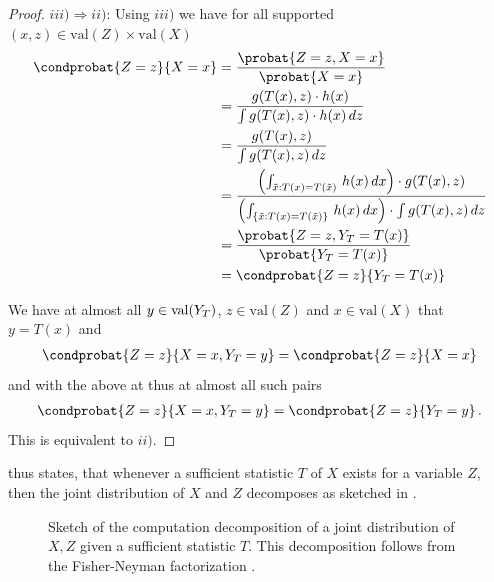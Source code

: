 \documentclass[aps,onecolumn,nofootinbib,pra]{article}
\begin{document}
\begin{proof}
        $iii) \Rightarrow ii)$:
        Using $iii)$ we have for all supported $(x,z)\in\mathrm{val}(Z)\times \mathrm{val}(X)$
        \begin{align*}
            \condprobat{Z=z}{X=x}
            &= \frac{\probat{Z=z,X=x}}{\probat{X=x}} \\
            &= \frac{g(T(x),z) \cdot h(x) }{\int g(T(x),z) \cdot h(x) \, dz} \\
            &= \frac{g(T(x),z)}{\int g(T(x),z)  \, dz} \\
            &= \frac{
                \left(\int_{\tilde{x}:T(x)=T(\tilde{x})} \, h(x) \, dx \right) \cdot g(T(x),z)
            }{
                \left(\int_{\{\tilde{x}:T(x)=T(\tilde{x})\}} \, h(x) \, dx \right) \cdot \int g(T(x),z)  \, dz
            } \\
            &= \frac{\probat{Z=z,\headvariableof{T}=T(x)}}{\probat{\headvariableof{T}=T(x)}} \\
            &= \condprobat{Z=z}{\headvariableof{T}=T(x)}
        \end{align*}

        We have at almost all $y\in\mathrm{val}(Y_{T})$, $z\in\mathrm{val}(Z)$ and $x\in\mathrm{val}(X)$ that $y=T(x)$ and
        \begin{align*}
            \condprobat{Z=z}{X=x,\headvariableof{T}=y}
            = \condprobat{Z=z}{X=x}
        \end{align*}
        and with the above at thus at almost all such pairs
        \begin{align*}
            \condprobat{Z=z}{X=x,\headvariableof{T}=y} = \condprobat{Z=z}{\headvariableof{T}=y} \, .
        \end{align*}
        This is equivalent to $ii)$.
    \end{proof}

     thus states, that whenever a sufficient statistic $T$ of $X$ exists for a variable $Z$, then the joint distribution of $X$ and $Z$ decomposes as sketched in .

    \begin{figure}[t]
        \begin{center}
            
        \end{center}
        \caption{Sketch of the computation decomposition of a joint distribution of $X,Z$ given a sufficient statistic $T$.
        This decomposition follows from the Fisher-Neyman factorization .}\label{fig:comDecSufStat}
    \end{figure}
\end{document}
